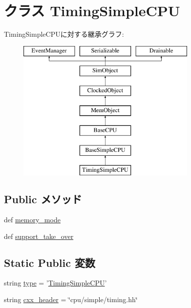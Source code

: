 \hypertarget{classTimingSimpleCPU_1_1TimingSimpleCPU}{
\section{クラス TimingSimpleCPU}
\label{classTimingSimpleCPU_1_1TimingSimpleCPU}
}
TimingSimpleCPUに対する継承グラフ:\begin{figure}[H]
\begin{center}
\leavevmode
\includegraphics[height=7cm]{classTimingSimpleCPU_1_1TimingSimpleCPU}
\end{center}
\end{figure}
\subsection*{Public メソッド}
\begin{DoxyCompactItemize}
\item 
def \hyperlink{classTimingSimpleCPU_1_1TimingSimpleCPU_a53d73a2f804df6a1dcabb22052d09773}{memory\_\-mode}
\item 
def \hyperlink{classTimingSimpleCPU_1_1TimingSimpleCPU_aa201537acf29724056129b8efad43371}{support\_\-take\_\-over}
\end{DoxyCompactItemize}
\subsection*{Static Public 変数}
\begin{DoxyCompactItemize}
\item 
string \hyperlink{classTimingSimpleCPU_1_1TimingSimpleCPU_acce15679d830831b0bbe8ebc2a60b2ca}{type} = '\hyperlink{classTimingSimpleCPU_1_1TimingSimpleCPU}{TimingSimpleCPU}'
\item 
string \hyperlink{classTimingSimpleCPU_1_1TimingSimpleCPU_a17da7064bc5c518791f0c891eff05fda}{cxx\_\-header} = \char`\"{}cpu/simple/timing.hh\char`\"{}
\end{DoxyCompactItemize}


